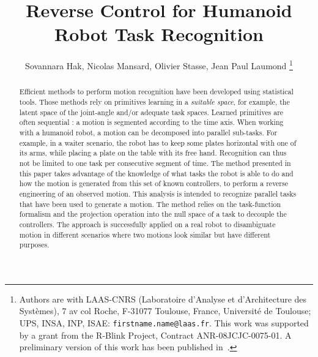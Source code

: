 \documentclass[journal]{IEEEtran}
\begin{document}
\title{\LARGE Reverse Control for Humanoid Robot Task Recognition}

\author{Sovannara Hak, Nicolas Mansard, Olivier Stasse, Jean Paul Laumond%
  \thanks{Authors are with LAAS-CNRS (Laboratoire d'Analyse et d'Architecture
  des Syst\`emes), 7 av col Roche, F-31077 Toulouse, France, Universit\'e de Toulouse; UPS, INSA, INP, ISAE: {\tt\small firstname.name@laas.fr}.
This work was supported by a grant from the R-Blink Project, Contract
  ANR-08JCJC-0075-01. A preliminary version of this work has been published in~\cite{hak10}.  }
  }

\maketitle


\begin{abstract}
Efficient methods to perform motion recognition have been developed
using statistical tools. Those methods rely on primitives learning
in a \emph{suitable space}, for example, the latent space of the joint-angle and/or adequate task spaces.
Learned primitives are often sequential : a motion is segmented according to the time axis.
When working with a humanoid robot, a motion can be decomposed into
parallel sub-tasks. For example, in a waiter scenario,
the robot has to keep some plates horizontal with one of its arms, while placing a plate
on the table with its free hand.
Recognition can thus not be limited to one task per consecutive segment of
time.
The method presented in this paper
takes advantage of the knowledge of what tasks the robot is able to do and how
the motion is generated from this set of known controllers, to perform a reverse engineering of an
observed motion. This analysis is intended to recognize parallel tasks that
have been used to generate a motion. The method relies
on the task-function formalism and the projection operation into the null space of a task to decouple
the controllers.
The approach is successfully applied on a real robot
to disambiguate motion in different scenarios where two motions look similar but have
different purposes.
\end{abstract}
\end{document}
